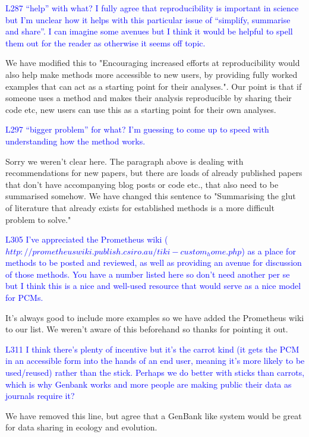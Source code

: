 \documentclass[12pt]{letter}
\begin{document}
\begin{letter}{}
\textcolor{blue}{L287 “help” with what? I fully agree that reproducibility is important in science but I'm unclear how it helps with this particular issue of “simplify, summarise and share”. I can imagine some avenues but I think it would be helpful to spell them out for the reader as otherwise it seems off topic.}

We have modified this to "Encouraging increased efforts at reproducibility would also help make methods more accessible to new users, by providing fully worked examples that can act as a starting point for their analyses.". Our point is that if someone uses a method and makes their analysis reproducible by sharing their code etc, new users can use this as a starting point for their own analyses. 

\textcolor{blue}{L297 “bigger problem” for what? I'm guessing to come up to speed with understanding how the method works.}

Sorry we weren't clear here. The paragraph above is dealing with recommendations for new papers, but there are loads of already published papers that don't have accompanying blog posts or code etc., that also need to be summarised somehow. We have changed this sentence to "Summarising the glut of literature that already exists for established methods is a more difficult problem to solve."

\textcolor{blue}{L305 I've appreciated the Prometheus wiki ($http://prometheuswiki.publish.csiro.au/tiki-custom_home.php$) as a place for methods to be posted and reviewed, as well as providing an avenue for discussion of those methods. You have a number listed here so don't need another per se but I think this is a nice and well-used resource that would serve as a nice model for PCMs.}

It's always good to include more examples so we have added the Prometheus wiki to our list. We weren't aware of this beforehand so thanks for pointing it out.

\textcolor{blue}{L311 I think there's plenty of incentive but it's the carrot kind (it gets the PCM in an accessible form into the hands of an end user, meaning it's more likely to be used/reused) rather than the stick. Perhaps we do better with sticks than carrots, which is why Genbank works and more people are making public their data as journals require it?}

We have removed this line, but agree that a GenBank like system would be great for data sharing in ecology and evolution.


\end{letter}
\end{document}
